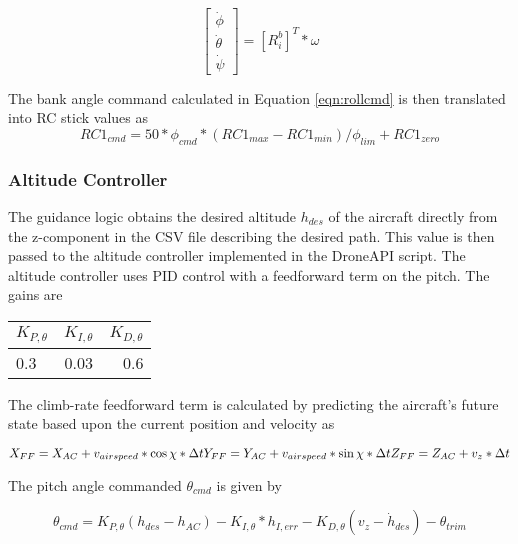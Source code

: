 \documentclass{aiaa}
\begin{document}
\begin{equation}
	\begin{bmatrix}
    \dot{\phi}\\
    \dot{\theta}\\
    \dot{\psi}
    \end{bmatrix}
    =[R_i^b]^T*\omega
\end{equation}

The bank angle command calculated in Equation \eqref{eqn:rollcmd} is then translated into RC stick values as
\begin{equation}
RC1_{cmd} = 50*\phi_{cmd}*(RC1_{max} - RC1_{min})/\phi_{lim} + RC1_{zero}
\end{equation}

\subsubsection{Altitude Controller}

The guidance logic obtains the desired altitude $h_{des}$ of the aircraft directly from the z-component in the CSV file describing the desired path. This value is then passed to the altitude controller implemented in the DroneAPI script. The altitude controller uses PID control with a feedforward term on the pitch. The gains are
\begin{center}
\begin{tabular}{ l| c | r}
	
    $K_{P,\theta}$ & $K_{I,\theta}$ & $K_{D,\theta}$ \\
    \hline \hline
    0.3 & 0.03 & 0.6 \\
    \hline


\end{tabular}
\end{center}
The climb-rate feedforward term is calculated by predicting the aircraft's future state based upon the current position and velocity as

\begin{equation}
X_{FF} = X_{AC} + v_{airspeed}*\cos{\chi}*\Delta t
\newline
Y_{FF} = Y_{AC} + v_{airspeed}*\sin{\chi}*\Delta t
\newline
Z_{FF} = Z_{AC} + v_z*\Delta t
\end{equation}

The pitch angle commanded $\theta_{cmd}$ is given by

\begin{equation} \theta_{cmd} = K_{P,\theta}(h_{des} - h_{AC}) - K_{I,\theta}*h_{I,err} - K_{D,\theta}(v_z - \dot{h}_{des}) - \theta_{trim}
\end{equation}
\end{document}
